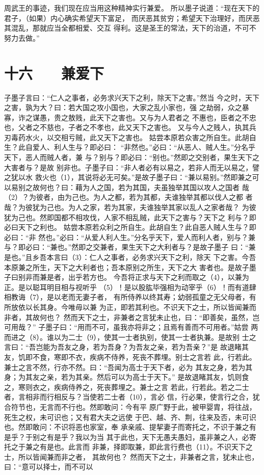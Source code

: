 \documentclass[12pt,UTF8]{ctexbook}
\begin{document}
周武王的事迹，我们现在应当用这种精神实行兼爱。 
所以墨子说道：“现在天下的君子，（如果）内心确实希望天下富足， 
而厌恶其贫穷；希望天下治理好，而厌恶其混乱，那就应当全都相爱、交互 
得利。这是圣王的常法，天下的治道，不可不努力去做。” 

\chapter{十六　　兼爱下}

子墨子言曰：“仁人之事者，必务求兴天下之利，除天下之害。”然当 
今之时，天下之害，孰为大？曰：若大国之攻小国也，大家之乱小家也，强 
之劫弱，众之暴寡，诈之谋愚，贵之敖贱，此天下之害也。又与为人君者之 
不惠也，臣者之不忠也，父者之不慈也，子者之不孝也，此又天下之害也。 
又与今人之贱人，执其兵刃毒药水火，以交相亏贼，此又天下之害也。 
姑尝本原若众害之所自生。此胡自生？此自爱人、利人生与？即必曰： 
“非然也。”必曰：“从恶人、贼人生。”分名乎天下，恶人而贼人者，兼 
与？别与？即必曰：“别也。”然即之交别者，果生天下之大害者与？是故 
别非也。子墨子曰：“非人者必有以易之，若非人而无以易之，譬之犹以水 
救火也（1），其说将必无可矣。”是故子墨子曰：“兼以易别。”然即兼之可 
以易别之故何也？曰：藉为人之国，若为其国，夫虽独举其国以攻人之国者 
哉（2）？为彼者，由为己也。为人之都，若为其都，夫谁独举其都以伐人之都 
者哉？为彼犹为己也。为人之家，若为其家，夫谁独举其家以乱人之家者哉？ 
为彼犹为己也。然即国都不相攻伐，人家不相乱贼，此天下之害与？天下之 
利与？即必曰天下之利也。 
姑尝本原若众利之所自生。此胡自生？此自恶人贼人生与？即必曰：“非 
然也。”必曰：“从爱人利人生。”分名乎天下，爱人而利人者，别与？兼 
与？即必曰：“兼也。”然即之交兼者，果生天下之大利者与？是故子墨子 
曰：“兼是也。”且乡吾本言曰（3）：仁人之事者，必务求兴天下之利，除天 
下之害。今吾本原兼之所生，天下之大利者也；吾本原别之所生，天下之大 
害者也。是故子墨子曰别非而兼是者，出乎若方也。 
今吾将正求与天下之利而取之（4），以兼为正。是以聪耳明目相与视听乎 
（5）！是以股肱毕强相为动宰乎（6）！而有道肆相教诲（7），是以老而无妻子者， 
有所侍养以终其寿；幼弱孤童之无父母者，有所放依以长其身。今唯毋以兼 
为正，即若其利也。不识天下之士，所以皆闻兼而非者，其故何也？ 
然而天下之士，非兼者之言犹未止也，曰：“即善矣，虽然，岂可用哉？” 
子墨子曰：“用而不可，虽我亦将非之；且焉有善而不可用者。”姑尝 
两而进之（8）。谁以为二士（9），使其一士者执别，使其一士者执兼。是故别 
士之言曰：“吾岂能为吾友之身，若为吾身？为吾友之亲，若为吾亲？”是 
故退睹其友，饥即不食，寒即不衣，疾病不侍养，死丧不葬埋。别士之言若 
此，行若此。兼士之言不然，行亦不然。曰：“吾闻为高士于天下者，必为 
其友之身，若为其身；为其友之亲，若为其亲。然后可以为高士于天下。” 
是故退睹其友，饥则食之，寒则衣之，疾病侍养之，死丧葬埋之。兼士之言 
若此，行若此。若之二士者，言相非而行相反与？当使若二士者（10），言必 
信，行必果，使言行之合，犹合符节也，无言而不行也。然即敢问：今有平 
原广野于此，被甲婴胄，将往战，死生之权，未可识也；又有君大夫之远使 
于巴、越、齐、荆，往来及否，未可识也。然即敢问：不识将恶也家室，奉 
承亲戚、提挈妻子而寄托之，不识于兼之有是乎？于别之有是乎？我以为当 
其于此也，天下无愚夫愚妇，虽非兼之人，必寄托之于兼之有是也。此言而 
非兼，择即取兼，即此言行费也（11）。不识天下之士，所以皆闻兼而非之者， 
其故何也？ 
然而天下之士，非兼者之言，犹未止也，曰：“意可以择士，而不可以 
\end{document}
